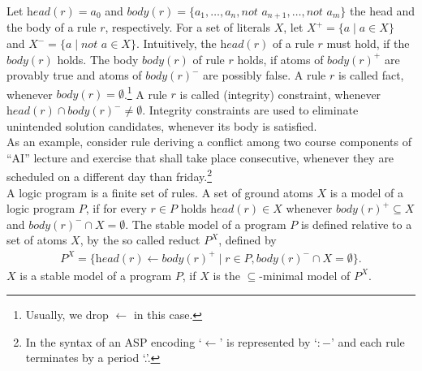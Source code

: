 \documentclass{easychair}
\newcommand{\ASP}{ASP}
\newcommand{\naf}{\textit{not }}
\newcommand{\head}{\textit{head}}
\newcommand{\body}{\textit{body}}
\begin{document}
  Let $\head{(r)} = a_0$ and $\body{(r)} = \{a_1,\dots,a_n,\naf{} a_{n+1},\dots,\naf{} a_m\}$ the head and the body of a rule $r$, respectively. 
  For a set of literals $X$, let $X^+ = \{a \mid a\in X \}$ and $X^- = \{a \mid \naf{} a\in X\}$. 
  Intuitively, the $\head{(r)}$ of a rule $r$ must hold, if the $\body{(r)}$ holds. 
  The body $\body{(r)}$ of rule $r$ holds, if atoms of $\body{(r)}^+$ are provably true and atoms of $\body{(r)}^-$ are possibly false. 
  A rule $r$ is called fact, whenever $\body{(r)}=\emptyset$.\footnote{Usually, we drop $\leftarrow$ in this case.} 
  A rule $r$ is called (integrity) constraint, whenever $\head{(r)}\cap\body{(r)}^-\neq\emptyset$. %
  Integrity constraints are used to eliminate unintended solution candidates, whenever its body is satisfied. \\
  As an example, consider rule 
  deriving a conflict among two course components of ``AI'' lecture and exercise that shall take place consecutive, whenever they are scheduled on a different day than friday.\footnote{In the syntax of an \ASP{} encoding `$\leftarrow$' is represented by `$:-$' and each rule terminates by a period `.'.}  \\
  A logic program is a finite set of rules. 
  A set of ground atoms $X$ is a model of a logic program $P$, if for every $r\in P$ holds $\head{(r)}\in X$ whenever $\body{(r)}^+\subseteq X$ and $\body{(r)}^-\cap X=\emptyset$.
  The stable model of a program $P$ is defined relative to a set of atoms $X$, by the so called reduct $P^X$, defined by 
  \begin{align*}
    P^X=\{\head{(r)}\leftarrow \body{(r)}^+\mid r\in P, \body{(r)}^-\cap X = \emptyset\}.
  \end{align*}
  $X$ is a stable model of a program $P$, if $X$ is the $\subseteq$-minimal model of $P^X$. \\
\end{document}
